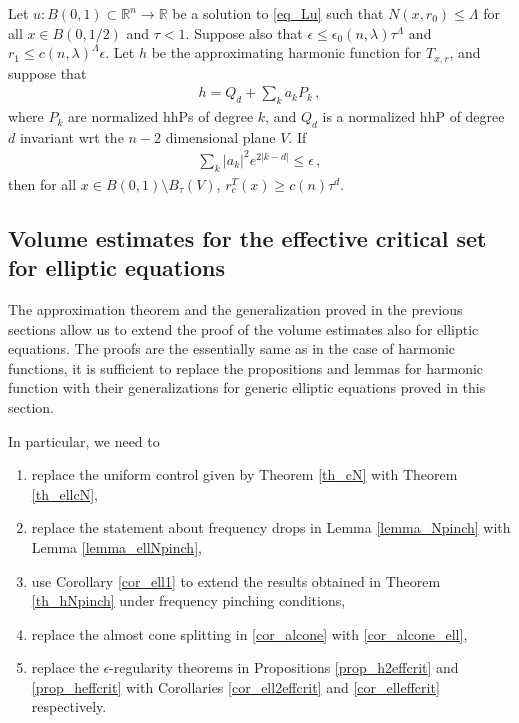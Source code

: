 \documentclass[11pt]{article}
\begin{document}
\begin{corollary}\label{cor_elleffcrit}
  Let $u:B(0,1)\subset {\mathbb{R}}^n\to {\mathbb{R}}$ be a solution to \eqref{eq_Lu} such that $N(x,r_0)\leq \Lambda$ for all $x\in B(0,1/2)$ and $\tau<1$. Suppose also that $\epsilon\leq \epsilon_0(n,\lambda)\tau^\Lambda$ and $r_1\leq c(n,\lambda)^\Lambda \epsilon$.  Let $h$ be the approximating harmonic function for $T_{x,r}$, and suppose that
 \begin{gather}
  h=Q_d + \sum_k a_k P_k\, ,
 \end{gather}
where $P_k$ are normalized hhPs of degree $k$, and $Q_d$ is a normalized hhP of degree $d$ invariant wrt the $n-2$ dimensional plane $V$. If 
\begin{gather}
 \sum_k {\left|{a_k}\right|}^2 e^{2{\left|{k-d}\right|}}\leq \epsilon\, ,
\end{gather}
then for all $x\in B(0,1)\setminus B_\tau(V)$, $r_c^T(x)\geq c(n) \tau^{d}$. 
\end{corollary}

\subsection{Volume estimates for the effective critical set for elliptic equations}
The approximation theorem and the generalization proved in the previous sections allow us to extend the proof of the volume estimates also for elliptic equations. The proofs are the essentially same as in the case of harmonic functions, it is sufficient to replace the propositions and lemmas for harmonic function with their generalizations for generic elliptic equations proved in this section.

In particular, we need to
\begin{enumerate}
 \item replace the uniform control given by Theorem \ref{th_cN} with Theorem \ref{th_ellcN},
 \item replace the statement about frequency drops in Lemma \ref{lemma_Npinch} with Lemma \ref{lemma_ellNpinch},
 \item use Corollary \ref{cor_ell1} to extend the results obtained in Theorem \ref{th_hNpinch} under frequency pinching conditions,
 \item replace the almost cone splitting in \ref{cor_alcone} with \ref{cor_alcone_ell},
 \item replace the $\epsilon$-regularity theorems in Propositions \ref{prop_h2effcrit} and \ref{prop_heffcrit} with Corollaries \ref{cor_ell2effcrit} and \ref{cor_elleffcrit} respectively.
\end{enumerate}
\end{document}
